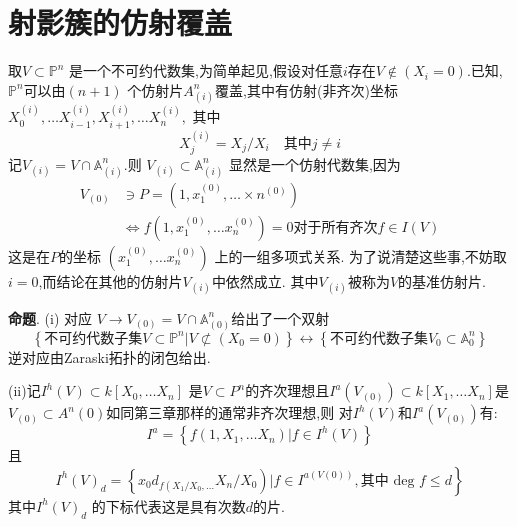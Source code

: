 \documentclass[UTF8]{book}
\begin{document}
	\section{射影簇的仿射覆盖}
	
		取$V \subset \mathbb{P}^{n}$ 是一个不可约代数集,为简单起见,假设对任意$ i $存在$V \notin\left(X_{i}=0\right)$.已知,$\mathbb{P}^{n}$可以由$( n +1)$ 个仿射片$A ^{ n }_{( i )}$覆盖,其中有仿射(非齐次)坐标$X _{0}^{( i )}, \ldots X _{ i -1}^{( i )}, X _{ i +1}^{( i )}, \ldots X _{ n }^{( i )},$ 其中
		\begin{equation*}
		X _{ j }^{( i )}= X _{ j } / X _{ i } \quad \text {其中} j \neq i
		\end{equation*}
		记$V_{(i)}=V \cap \mathbb{A}^{n}_{(i)} .$则 $V_{(i)} \subset \mathbb{A}^{n}_{(i)}$ 显然是一个仿射代数集,因为
		\begin{equation*}
		\begin{aligned}
		V _{(0)} & \ni P =\left(1, x _{1}^{(0)}, \ldots \times n ^{(0)}\right) \\
		& \Longleftrightarrow f \left(1, x _{1}^{(0)}, \ldots x _{ n }^{(0)}\right)=0  \text {对于所有齐次} f \in I ( V )
		\end{aligned}
		\end{equation*}
		这是在$ P $的坐标 $\left(x_{1}^{(0)}, \ldots x_{n}^{(0)}\right)$ 上的一组多项式关系. 为了说清楚这些事,不妨取$i =0$,而结论在其他的仿射片$V _{( i )} $中依然成立. 其中$V _{( i )}$被称为$V$的基准仿射片.
		
		
		\textbf{命题}. (i) 对应 $V  \rightarrow V _{(0)}= V \cap \mathbb{A} ^{ n }_{(0)}$给出了一个双射
		\begin{equation*}
		\left\{
		\text {不可约代数子集} V\subset \mathbb{P}^{n} | V \not\subset(X_{0} = 0)
		\right\}
		\longleftrightarrow
		\left\{
		\text {不可约代数子集} V_{0}\subset \mathbb{A}^{n}_{0}
		\right\}
		\end{equation*}
		逆对应由Zaraski拓扑的闭包给出.
		
		
		(ii)记$I ^{ h }( V ) \subset k \left[ X _{0}, \ldots X _{ n }\right]$ 是$V \subset P ^{ n }$的齐次理想且$I ^{ a }\left( V _{(0)}\right) \subset k \left[ X _{1}, \ldots X _{ n }\right]$是$V _{(0)} \subset A ^{ n }(0) $如同第三章那样的通常非齐次理想,则 对$I ^{ h }( V )$和$I ^{ a }\left( V _{(0)}\right)$有:
		\begin{equation*}
		I ^{ a }=\left\{ f \left(1, X _{1}, \ldots X _{ n }\right) | f \in I ^{ h }( V )\right\}
		\end{equation*}
		且
		\begin{equation*}
		\left. I ^{ h }( V )_{ d }=\left\{ x _{0} d _{ f \left( X _{1} / X _{0}, \dots\right.} X _{ n } / X _{0}\right) | f \in I ^{ a ( V (0))}, \text {其中 deg } f \leq d \right\}
		\end{equation*}
		其中$I ^{ h }( V )_{ d }$ 的下标代表这是具有次数$ d $的片. 
		
\end{document}
